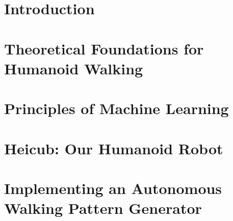 \documentclass  [
paper    = a4,
BCOR     = 10mm,
twoside,
fontsize = 12pt,
toc      = bibnumbered,
toc      = listofnumbered,
numbers  = noendperiod,
headings = normal,
listof   = leveldown,
version  = 3.03
]                                       {scrreprt}
\begin{document}
	
	
	\tableofcontents
	
	\chapter{Introduction}
	
	
	\chapter{Theoretical Foundations for Humanoid Walking}
	
	\chapter{Principles of Machine Learning}

	\chapter{Heicub: Our Humanoid Robot}
	

	\chapter{Implementing an Autonomous Walking Pattern Generator}
	
	
	
	
	
	
\end{document}
